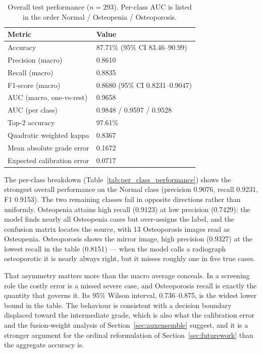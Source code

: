 \documentclass[journal]{IEEEtran}
\begin{document}
\begin{table}[!t]
\centering
\caption{Overall test performance ($n = 293$). Per-class AUC is listed in the
order Normal / Osteopenia / Osteoporosis.}
\label{tab:overall_performance}
\begin{tabular}{@{}l l@{}}
\toprule
\textbf{Metric} & \textbf{Value} \\
\midrule
Accuracy & 87.71\% (95\% CI 83.46--90.99) \\
Precision (macro) & 0.8610 \\
Recall (macro) & 0.8835 \\
F1-score (macro) & 0.8680 (95\% CI 0.8231--0.9047) \\
AUC (macro, one-vs-rest) & 0.9658 \\
AUC (per class) & 0.9848 / 0.9597 / 0.9528 \\
Top-2 accuracy & 97.61\% \\
Quadratic weighted kappa & 0.8367 \\
Mean absolute grade error & 0.1672 \\
Expected calibration error & 0.0717 \\
\bottomrule
\end{tabular}
\end{table}

The per-class breakdown (Table~\ref{tab:per_class_performance}) shows the
strongest overall performance on the Normal class (precision 0.9076, recall
0.9231, F1 0.9153). The two remaining classes fail in opposite directions rather
than uniformly. Osteopenia attains high recall (0.9123) at low precision
(0.7429): the model finds nearly all Osteopenia cases but over-assigns the
label, and the confusion matrix locates the source, with 13 Osteoporosis images
read as Osteopenia. Osteoporosis shows the mirror image, high precision (0.9327)
at the lowest recall in the table (0.8151) --- when the model calls a radiograph
osteoporotic it is nearly always right, but it misses roughly one in five true
cases.

That asymmetry matters more than the macro average conceals. In a screening
role the costly error is a missed severe case, and Osteoporosis recall is
exactly the quantity that governs it. Its 95\% Wilson interval, 0.736--0.875,
is the widest lower bound in the table. The behaviour is consistent with a
decision boundary displaced toward the intermediate grade, which is also what
the calibration error and the fusion-weight analysis of
Section~\ref{sec:auxensemble} suggest, and it is a stronger argument for the
ordinal reformulation of Section~\ref{sec:futurework} than the aggregate
accuracy is.
\end{document}
